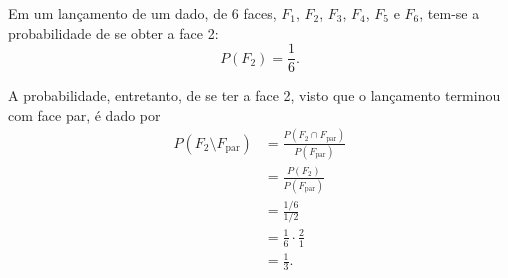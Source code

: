 \begin{example}
	Em um lançamento de um dado, de 6 faces, $F_1$, $F_2$, $F_3$, $F_4$, $F_5$ e $F_6$, tem-se a probabilidade de se obter a face 2:
	\[
		P(F_2)=\frac{1}{6}\text{.}
	\]
	
	A probabilidade, entretanto, de se ter a face 2, visto que o lançamento terminou com face par, é dado por
	\begin{align*}
		P(F_2\setminus F_{\text{par}})&=\frac{P(F_2 \cap F_{\text{par}})}{P(F_{\text{par}})}\\
									   &=\frac{P(F_2)}{P(F_{\text{par}})}\\
									   &=\frac{1/6}{1/2}\\
									   &=\frac{1}{6}\cdot \frac{2}{1}\\
									   &=\frac{1}{3}\text{.}
	\end{align*}
\end{example}

\newpage

